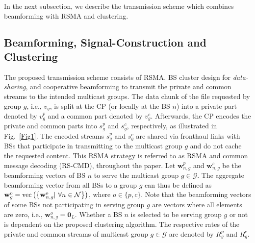 \documentclass[12pt,draftcls,onecolumn]{IEEEtran}
\theoremstyle{remark}
\theoremstyle{definition}
\begin{document}
In the next subsection, we describe the transmission scheme which combines beamforming with RSMA and clustering. 
\subsection{Beamforming, Signal-Construction and Clustering}
The proposed transmission scheme consists of RSMA, BS cluster design for \emph{data-sharing}, and cooperative beamforming to transmit the private and common streams to the intended multicast groups. The data chunk of the file requested by group $g$, i.e., $v_g$, is split at the CP (or locally at the BS $n$) into a private part denoted by $v_{g}^p$ and a common part denoted by $v_{g}^c$.
Afterwards, the CP encodes the private and common parts into $s_{g}^p$ and $s_{g}^c$, respectively, as illustrated in Fig.~\ref{Fig1}. The encoded streams $s_{g}^p$ and $s_{g}^c$ are shared via fronthaul links with BSs that participate in transmitting to the multicast group $g$ and do not cache the requested content. This RSMA strategy is referred to as RSMA and common message decoding (RS-CMD), throughout the paper. Let $\mathbf{w}_{n,g}^p$ and $\mathbf{w}_{n,g}^c$ be the beamforming vectors of BS $n$ to serve the multicast group $g \in \mathcal{G}$. The aggregate beamforming vector from all BSs to a group $g$ can thus be defined as $\mathbf{w}_{g}^o = {\rm vec}\left(\left\{\mathbf{w}_{n,g}^o | \,\, \forall n\in\mathcal{N}\right\}\right)$, where $o\in\{p,c\}$. Note that the beamforming vectors of some BSs not participating in serving group $g$ are vectors where all elements are zero, i.e., $\mathbf{w}_{n,g}^o = \mathbf{0}_L$. Whether a BS $n$ is selected to be serving group $g$ or not is dependent on the proposed clustering algorithm. The respective rates of the private and common streams of multicast group $g \in \mathcal{G}$ are denoted by $R_g^p$ and $R_g^c$. %
\end{document}
